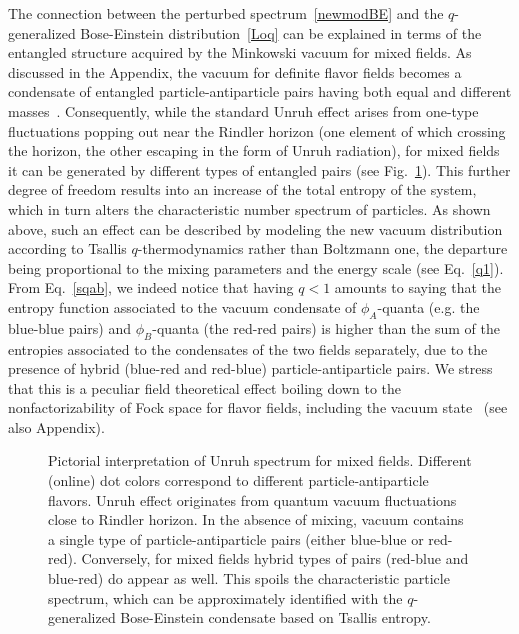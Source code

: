 \documentclass[floats,prd,aps,amssymb,nofootinbib,showkeys]{revtex4}
\begin{document}
The connection between 
the perturbed spectrum~\eqref{newmodBE}
and the $q$-generalized Bose-Einstein distribution~\eqref{Loq}
can be explained in terms of the entangled 
structure acquired by the Minkowski vacuum
for mixed fields. As discussed in the Appendix, 
the vacuum for definite flavor fields
becomes a condensate of entangled particle-antiparticle
pairs having both equal and different masses~\cite{BV95,BlasCap}.
Consequently, while
the standard Unruh effect arises from 
one-type fluctuations popping out near the Rindler horizon
(one element of which crossing the horizon, 
the other escaping in the form of Unruh radiation), 
for mixed fields it can be generated by different types of 
entangled pairs (see Fig.~\ref{Rindlerbis}).
This further degree of freedom results into an increase of the
total entropy of the system, which in turn
alters the characteristic number spectrum of particles. 
As shown above, such an effect can be 
described by modeling the new vacuum distribution 
according to Tsallis $q$-thermodynamics
rather than Boltzmann one, 
the departure being proportional to the mixing
parameters and the energy scale (see Eq.~\eqref{q1}). 
From Eq.~\eqref{sqab}, we indeed notice that
having $q<1$ amounts to saying that the 
entropy function associated to the vacuum condensate
of $\phi_A$-quanta (e.g. the blue-blue pairs) and $\phi_B$-quanta 
(the red-red pairs)
is higher than the sum of the entropies 
associated to the condensates of the
two fields separately, due to the presence of
hybrid (blue-red and red-blue) particle-antiparticle pairs.
We stress that this is a peculiar field theoretical effect
boiling down to the nonfactorizability of Fock space for flavor fields,
including the vacuum state~\cite{Cabo} (see also Appendix). 

 \begin{figure}[t]
\caption{\small{Pictorial interpretation of Unruh spectrum  for mixed fields. Different (online) dot colors correspond to different particle-antiparticle flavors. Unruh effect originates from
quantum vacuum fluctuations close to Rindler horizon.
In the absence of mixing, vacuum contains a single type of particle-antiparticle pairs (either blue-blue or red-red). Conversely, for mixed fields hybrid types of pairs (red-blue and blue-red) do appear as well. This spoils the characteristic particle spectrum, which can be approximately identified with the $q$-generalized Bose-Einstein condensate based on Tsallis entropy.}}
\label{Rindlerbis}
\end{figure}
\end{document}
